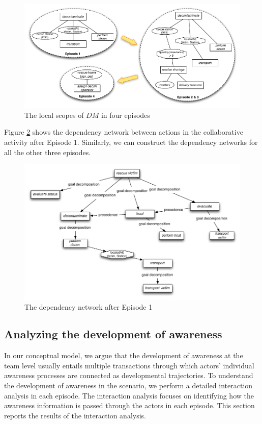 \begin{figure}[htbp] %
	\centering
	\includegraphics[width=5.8in]{local_scopes_dm.pdf} 
	\caption{The local scopes of $DM$ in four episodes}
	\label{fig:local_scopes_dm}
\end{figure}

Figure \ref{fig:dependencies_ep1} shows the dependency network between actions in the collaborative activity after Episode 1. Similarly, we can construct the dependency networks for all the other three episodes.

\begin{figure}[htbp] %
	\centering
	\includegraphics[width=5.8in]{dependencies_ep1.pdf} 
	\caption{The dependency network after Episode 1}
	\label{fig:dependencies_ep1}
\end{figure}

\subsection{Analyzing the development of awareness} %
\label{sub:analyzing_the_development_of_awareness_}
In our conceptual model, we argue that the development of awareness at the team level usually entails multiple transactions through which actors' individual awareness processes are connected as developmental trajectories. To understand the development of awareness in the scenario, we perform a detailed interaction analysis in each episode. The interaction analysis focuses on identifying how the awareness information is passed through the actors in each episode. This section reports the results of the interaction analysis.

